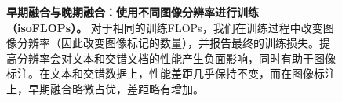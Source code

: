 \begin{figure}[t!]
    \centering
    \captionsetup{type=figure}
    \begin{subfigure}[t]{0.48\linewidth}
        
    \end{subfigure}
    \begin{subfigure}[t]{0.48\linewidth}
        
    \end{subfigure}
    \vspace{-7pt}
    \caption{\textbf{早期融合与晚期融合：使用不同图像分辨率进行训练（isoFLOPs）。} 对于相同的训练FLOPs，我们在训练过程中改变图像分辨率（因此改变图像标记的数量），并报告最终的训练损失。提高分辨率会对文本和交错文档的性能产生负面影响，同时有助于图像标注。在文本和交错数据上，性能差距几乎保持不变，而在图像标注上，早期融合略微占优，差距略有增加。}
    \label{fig:early_vs_late_imageres}
\end{figure}
